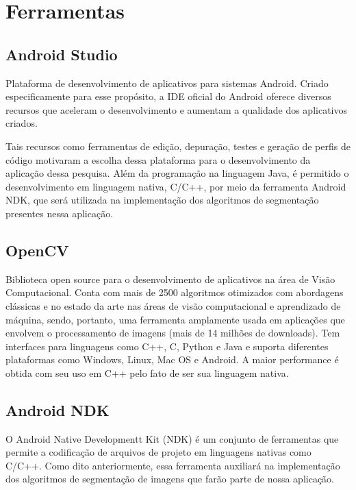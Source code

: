 
\chapter{Ferramentas}

\section{Android Studio}
Plataforma de desenvolvimento de aplicativos para sistemas Android. Criado especificamente para esse propósito, a IDE oficial do Android oferece diversos recursos que aceleram o desenvolvimento e aumentam a qualidade dos aplicativos criados.

Tais recursos como ferramentas de edição, depuração, testes e geração de perfis de código motivaram a escolha dessa plataforma para o desenvolvimento da aplicação dessa pesquisa. Além da programação na linguagem Java, é permitido o desenvolvimento em linguagem nativa, C/C++, por meio da ferramenta Android NDK, que será utilizada na implementação dos algoritmos de segmentação presentes nessa aplicação\citep{androidstudio}.



\section{OpenCV}
Biblioteca open source para o desenvolvimento de aplicativos na área de Visão Computacional. Conta com mais de 2500 algoritmos otimizados com abordagens clássicas e no estado da arte nas áreas de visão computacional e aprendizado de máquina, sendo, portanto, uma ferramenta amplamente usada em aplicações que envolvem o processamento de imagens (mais de 14 milhões de downloads). Tem interfaces para linguagens como C++, C, Python e Java e suporta diferentes plataformas como Windows, Linux, Mac OS e Android. A maior performance é obtida com seu uso em C++ pelo fato de ser sua linguagem nativa.\citep{opencv}

\section{Android NDK}
O Android Native Developmentt Kit (NDK) é um conjunto de ferramentas que permite a codificação de arquivos de projeto em linguagens nativas como C/C++. Como dito anteriormente, essa ferramenta auxiliará na implementação dos algoritmos de segmentação de imagens que farão parte de nossa aplicação.\citep{ndk}